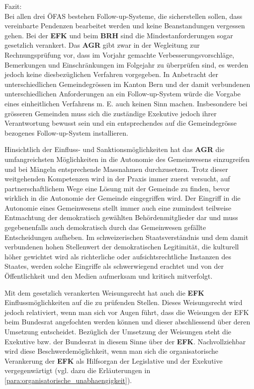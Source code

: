 \documentclass[10pt]{article}
\begin{document}
Fazit:\\
Bei allen drei ÖFAS bestehen Follow-up-Systeme, die sicherstellen sollen, dass vereinbarte Pendenzen bearbeitet werden und keine Beanstandungen vergessen gehen. Bei der \textbf{EFK} und beim \textbf{BRH} sind die Mindestanforderungen sogar gesetzlich verankert. Das \textbf{AGR} gibt zwar in der Wegleitung zur Rechnungsprüfung vor, dass im Vorjahr gemachte Verbesserungsvorschläge, Bemerkungen und Einschränkungen im Folgejahr zu überprüfen sind, es werden jedoch keine diesbezüglichen Verfahren vorgegeben. In Anbetracht der unterschiedlichen Gemeindegrössen im Kanton Bern und der damit verbundenen unterschiedlichen Anforderungen an ein Follow-up-System würde die Vorgabe eines einheitlichen Verfahrens m. E. auch keinen Sinn machen. Insbesondere bei grösseren Gemeinden muss sich die zuständige Exekutive jedoch ihrer Verantwortung bewusst sein und ein entsprechendes auf die Gemeindegrösse bezogenes Follow-up-System installieren.

Hinsichtlich der Einfluss- und Sanktionsmöglichkeiten hat das \textbf{AGR} die umfangreichsten Möglichkeiten in die Autonomie des Gemeinwesens einzugreifen und bei Mängeln entsprechende Massnahmen durchzusetzen. Trotz dieser weitgehenden Kompetenzen wird in der Praxis immer zuerst versucht, auf partnerschaftlichem Wege eine Lösung mit der Gemeinde zu finden, bevor wirklich in die Autonomie der Gemeinde eingegriffen wird. Der Eingriff in die Autonomie eines Gemeinwesens stellt immer auch eine zumindest teilweise Entmachtung der demokratisch gewählten Behörden­mitglieder dar und muss gegebenenfalls auch demokratisch durch das Gemeinwesen gefällte Entscheidungen aufheben. Im schweizerischen Staatsverständnis und dem damit verbundenen hohen Stellenwert der demokratischen Legitimität, die kulturell höher gewichtet wird als richterliche oder aufsichtsrechtliche Instanzen des Staates, werden solche Eingriffe als schwerwiegend erachtet und von der Öffentlichkeit und den Medien aufmerksam und kritisch mitverfolgt.

Mit dem gesetzlich verankerten Weisungsrecht hat auch die \textbf{EFK} Einflussmöglichkeiten auf die zu prüfenden Stellen. Dieses Weisungsrecht wird jedoch relativiert, wenn man sich vor Augen führt, dass die Weisungen der EFK beim Bundesrat angefochten werden können und dieser abschliessend über deren Umsetzung entscheidet. Bezüglich der Umsetzung der Weisungen steht die Exekutive bzw. der Bundesrat in diesem Sinne über der \textbf{EFK}. Nachvollziehbar wird diese Beschwerdemöglichkeit, wenn man sich die organisatorische Verankerung der \textbf{EFK} als Hilfsorgan der Legislative und der Exekutive vergegenwärtigt (vgl. dazu die Erläuterungen in \vref{para:organisatorische_unabhaengigkeit}).
\end{document}
